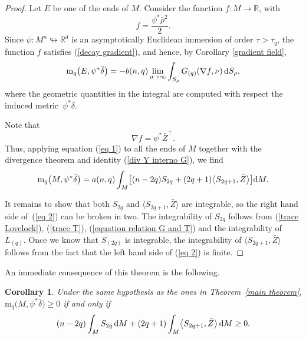 \documentclass[pdftex]{sigma}
\numberwithin{equation}{section}
\newtheorem{Corollary}[Theorem]{Corollary}
\begin{document}
\begin{proof}
 Let $E$ be one of the ends of $M$. Consider the function $f\colon M \to \mathbb{R}$, with
 \begin{equation*}
  f = \frac{\psi^\ast \bar{\rho}^2}{2}.
 \end{equation*}
 Since $\psi\colon  M^n \looparrowright \mathbb{R}^d$ is an asymptotically Euclidean immersion of order $\tau > \tau_q$, the function $f$ satisfies (\ref{decay gradient}), and hence, by Corollary \ref{gradient field},
 \begin{equation} \label{eq 1}
  \mathrm{m}_q \bigl(E,\psi^\ast \bar{\delta}\bigr) = -b(n,q) \lim_{\rho \to \infty} \int_{S_\rho} G_{(q)}(\nabla f,\nu)\, {\rm d}S_\rho,
 \end{equation}
 where the geometric quantities in the integral are computed with respect
 the induced metric~\(\psi^\ast \bar{\delta}\).

 Note that
 \begin{equation*}
  \nabla f = \psi^\ast \bar{Z}^\top.
 \end{equation*}
 Thus, applying equation (\ref{eq 1}) to all the ends of $M$ together
 with the divergence theorem and identity (\ref{div Y interno G}), we find
 \begin{equation} \label{eq 2}
  \mathrm{m}_q\bigl(M,\psi^\ast \bar{\delta}\bigr)
  = a(n,q) \int_M \bigl[ (n-2q)S_{2q} + (2q + 1) \bigl\langle S_{2q+1}, \bar{Z} \bigr\rangle \bigr] {\rm d}M.
 \end{equation}

 It remains to show that both $S_{2q}$ and $\bigl\langle S_{2q+1}, \bar{Z} \bigr\rangle$ are integrable, so the right hand side of~(\ref{eq 2}) can be broken in two. The integrability of $S_{2q}$ follows from (\ref{trace Lovelock}), (\ref{trace T}), (\ref{equation relation G and T}) and the integrability of $L_{(q)}$. Once we know that $S_{(2q)}$ is integrable, the integrability of $\bigl\langle S_{2q+1}, \bar{Z} \bigr\rangle$ follows from the fact that the left hand side of (\ref{eq 2}) is finite.
\end{proof}

An immediate consequence of this theorem is the following.

\begin{Corollary} \label{corollary main theorem}
 Under the same hypothesis as the ones in Theorem~{\rm \ref{main theorem}},
 $\mathrm{m}_q\bigl(M,\psi^*\bar{\delta}\bigr) \geq 0$ if and only if
 \begin{equation*}
  (n-2q) \int_M S_{2q} \, {\rm d}M + (2q+1) \int_M \bigl\langle S_{2q+1}, \bar{Z} \bigr\rangle \, {\rm d}M \geq 0.
 \end{equation*}
\end{Corollary}
\end{document}
